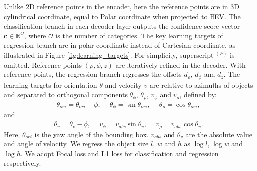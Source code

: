 \documentclass[letterpaper]{article} \usepackage{aaai23}  \usepackage{times}  \usepackage{helvet}  \usepackage{courier}  \usepackage[hyphens]{url}  \usepackage{graphicx} \urlstyle{rm} \def\UrlFont{\rm}  \usepackage{natbib}  \usepackage{caption} \frenchspacing  \setlength{\pdfpagewidth}{8.5in} \setlength{\pdfpageheight}{11in} \usepackage{algorithm}
\begin{document}
Unlike 2D reference points in the encoder,
here the reference points are in 3D cylindrical coordinate, equal to Polar coordinate when projected to BEV.
The classification branch in each decoder layer outputs the confidence score vector $\mathbf{c}\in \mathbb{R}^{\mathcal{O}}$, where $\mathcal{O}$ is the number of categories. The key learning targets of regression branch are in polar coordinate instead of Cartesian coordiante, as illustrated in Figure \ref{fig:learning_targets}. 
For simplicity, superscript $^{(P)}$ is omitted. 
Reference points $(\rho,\phi, z)$ are iteratively refined in the decoder. 
With reference points, the regression branch regresses the offsets $d_\rho$, $d_\phi$ and $d_z$. 
The learning targets for orientation $\theta$ and velocity $v$ are relative to azimuths of objects and separated to orthogonal
components $\theta_{\phi}$, $\theta_{\rho}$, $v_{\phi}$ and $v_{\rho}$, defined by:
\begin{equation}
        \bar{\theta}_{ori} = \theta_{ori} - \phi,\quad \ 
        \theta_{\phi} = \sin{\bar{\theta}_{ori}},\quad \ 
        \theta_{\rho} = \cos{\bar{\theta}_{ori}},
\end{equation}
and
\begin{equation}
        \bar{\theta}_{v} = \theta_{v} - \phi, \quad \ 
        v_{\phi} = v_{abs}\sin{\bar{\theta}_{v}}, \quad \ 
        v_{\rho} = v_{abs}\cos{\bar{\theta}_{v}}.
\end{equation}
Here, $\theta_{ori}$ is the yaw angle of the bounding box. $v_{abs}$ and $\theta_v$ are the absolute value and angle of velocity. We regress the object size $l$, $w$ and $h$ as $\log l$, $\log w$ and $\log h$. 
We adopt Focal loss \cite{lin2017focal} and L1 loss for classification and regression respectively.

\iffalse
\subsection{Temporal module}
To fully leverage the sequence data, we further conduct temporal fusion between the current sweep and one past sweep in the BEV representation space. Specifically, we concatenate two temporally adjacent BEV Polar feature maps along the feature dimension and then deploy
several convolution layers to reduce the dimension back to the origin. Extra encoder layers consisting of two residual blocks are applied before the fusion and BEV feature map of the past sweep is aligned according to ego-motion. Thanks to the convenience provided by BEV representation, this simple design of temporal fusion boosts the performance by a large extent. 
\fi
\end{document}
